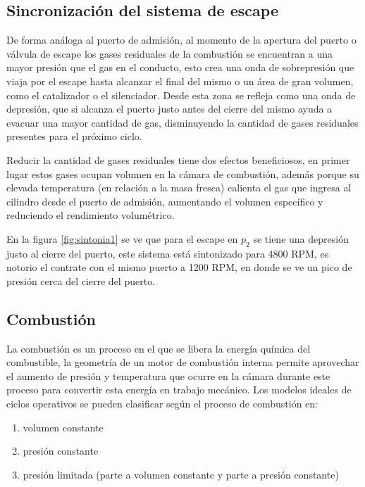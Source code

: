 
\subsection{Sincronización del sistema de escape}

De forma análoga al puerto de admisión, al momento de la apertura del puerto o
válvula de escape los gases residuales de la combustión se encuentran a una
mayor presión que el gas en el conducto, esto crea una onda de sobrepresión que
viaja por el escape hasta alcanzar el final del mismo o un área de gran volumen,
como el catalizador o el silenciador.
%
Desde esta zona se refleja como una onda de depresión, que si alcanza el puerto
justo antes del cierre del mismo ayuda a evacuar una mayor cantidad de gas,
disminuyendo la cantidad de gases residuales presentes para el próximo ciclo.

Reducir la cantidad de gases residuales tiene dos efectos beneficiosos, en
primer lugar estos gases ocupan volumen en la cámara de combustión, además
porque su elevada temperatura (en relación a la masa fresca) calienta el gas que
ingresa al cilindro desde el puerto de admisión, aumentando el volumen
específico y reduciendo el rendimiento volumétrico.

En la figura \ref{fig:sintonia1} se ve que para el escape en $p_2$ se tiene una
depresión justo al cierre del puerto, este sistema está sintonizado para 4800
RPM, es notorio el contrate con el mismo puerto a 1200 RPM, en donde se ve un
pico de presión cerca del cierre del puerto.


\subsection{Combustión}
%
La combustión es un proceso en el que se libera la energía química del
combustible, la geometría de un motor de combustión interna permite aprovechar
el aumento de presión y temperatura que ocurre en la cámara durante este proceso
para convertir esta energía en trabajo mecánico.
%
Los modelos ideales de ciclos operativos se pueden clasificar según el proceso
de combustión en:
%
\begin{enumerate}
    \item volumen constante
    \item presión constante
    \item presión limitada (parte a volumen constante y parte a presión
constante)
\end{enumerate}

